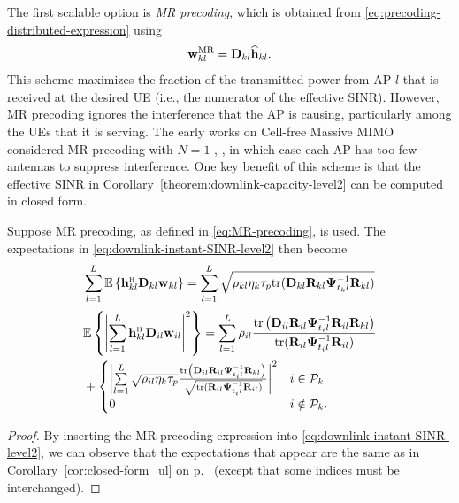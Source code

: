 The first scalable option is \emph{MR precoding}, which is obtained from \eqref{eq:precoding-distributed-expression} using
\begin{equation} \label{eq:MR-precoding}
\bar{\mathbf{w}}_{kl}^{{\rm MR}} =  \mathbf{D}_{kl}  \widehat{\mathbf{h}}_{kl}.
\end{equation}
This scheme maximizes the fraction of the transmitted power from AP $l$ that is received at the desired UE (i.e., the numerator of the effective SINR).
However, MR precoding ignores the interference that the AP is causing, particularly among the UEs that it is serving. 
The early works on Cell-free Massive MIMO considered MR precoding with $N=1$ \cite{Nayebi2017a}, \cite{Ngo2017b}, in which case each AP has too few antennas to suppress interference. One key benefit of this scheme is that the effective SINR in Corollary~\ref{theorem:downlink-capacity-level2} can be computed in closed form.


\begin{corollary} \label{cor:closed-form-dl}
	Suppose MR precoding, as defined in \eqref{eq:MR-precoding}, is used. The expectations in \eqref{eq:downlink-instant-SINR-level2} then become
	\begin{equation}  \label{eq:signal-term-MR-closed}
	\sum\limits_{l=1}^L  \mathbb{E}\left \{ \vect{h}_{kl}^{\Htran}\vect{D}_{kl}{\vect{w}}_{kl}\right \}
 = \sum_{l=1}^L \sqrt{\rho_{kl} \eta_k \tau_p \tr( \vect{D}_{kl} \vect{R}_{kl} \vect{\Psi}_{t_k l}^{-1} \vect{R}_{kl})}
\end{equation}
\begin{align} & \nonumber
 \mathbb{E} \left\{ \left| \sum\limits_{l=1}^{L}  \vect{h}_{kl}^{\Htran} \vect{D}_{il} {\vect{w}}_{il} \right|^2 \right\}  = \sum_{l=1}^{L} \rho_{il} \frac{  \tr \left(  \vect{D}_{il} \vect{R}_{il} \vect{\Psi}_{t_i l}^{-1} \vect{R}_{il} \vect{R}_{kl}  \right) }{ \tr( \vect{R}_{il} \vect{\Psi}_{t_i l}^{-1} \vect{R}_{il})} \\ & + \begin{cases}
\left|  \sum\limits_{l=1}^{L} \sqrt{ \rho_{il} \eta_k \tau_p} \frac{  \tr \left(  \vect{D}_{il} \vect{R}_{il} \vect{\Psi}_{t_i l}^{-1} \vect{R}_{kl}  \right) }{ \sqrt{ \tr( \vect{R}_{il} \vect{\Psi}_{t_i l}^{-1} \vect{R}_{il}) } } \right|^2 &    i \in \mathcal{P}_k
\\
0 &  i \notin \mathcal{P}_k. 
\end{cases} \label{eq:interference-term-MR-closed}
\end{align} 
\end{corollary}
\begin{proof}
By inserting the MR precoding expression into \eqref{eq:downlink-instant-SINR-level2}, we can observe that the expectations that appear are the same as in Corollary~\ref{cor:closed-form_ul} on p.~\pageref{cor:closed-form_ul} (except that some indices must be interchanged).
\end{proof}

